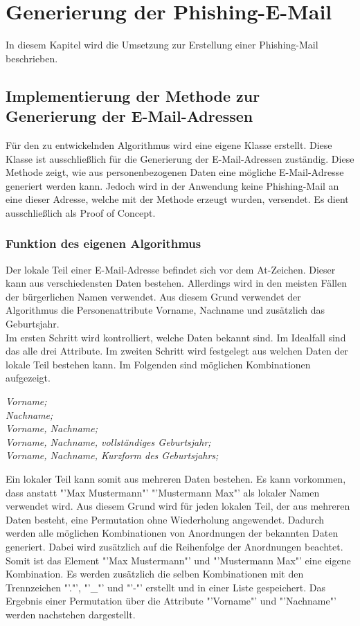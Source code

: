 
\chapter{Generierung der Phishing-E-Mail}  %
\label{cha:ErstellungeinerPhishing-Mail} %
In diesem Kapitel wird die Umsetzung zur Erstellung einer Phishing-Mail beschrieben.

\section{Implementierung der Methode zur Generierung der E-Mail-Adressen}	
Für den zu entwickelnden Algorithmus wird eine eigene Klasse erstellt. Diese Klasse ist ausschließlich für die Generierung der E-Mail-Adressen zuständig. Diese Methode zeigt, wie aus personenbezogenen Daten eine mögliche E-Mail-Adresse generiert werden kann. Jedoch wird in der Anwendung keine Phishing-Mail an eine dieser Adresse, welche mit der Methode erzeugt wurden, versendet. Es dient ausschließlich als Proof of Concept.

	\subsection{Funktion des eigenen Algorithmus}
	Der lokale Teil einer E-Mail-Adresse befindet sich vor dem At-Zeichen. Dieser kann aus verschiedensten Daten bestehen. Allerdings wird in den meisten Fällen der bürgerlichen Namen verwendet. \cite{NameAlsEMail} Aus diesem Grund verwendet der Algorithmus die Personenattribute Vorname, Nachname und zusätzlich das Geburtsjahr.\\
	Im ersten Schritt wird kontrolliert, welche Daten bekannt sind. Im Idealfall sind das alle drei Attribute. Im zweiten Schritt wird festgelegt aus welchen Daten der lokale Teil bestehen kann. Im Folgenden sind möglichen Kombinationen aufgezeigt.
	
	\textit{Vorname;}\\
	\textit{Nachname;}\\
	\textit{Vorname, Nachname;}\\
	\textit{Vorname, Nachname, vollständiges Geburtsjahr;}\\
	\textit{Vorname, Nachname, Kurzform des Geburtsjahrs;}
	
	Ein lokaler Teil kann somit aus mehreren Daten bestehen. Es kann vorkommen, dass anstatt "'Max Mustermann"' "'Mustermann Max"' als lokaler Namen verwendet wird. Aus diesem Grund wird für jeden lokalen Teil, der aus mehreren Daten besteht, eine Permutation ohne Wiederholung angewendet. Dadurch werden alle möglichen Kombinationen von Anordnungen der bekannten Daten generiert. Dabei wird zusätzlich auf die Reihenfolge der Anordnungen beachtet. Somit ist das Element "'Max Mustermann"' und "'Mustermann Max"' eine eigene Kombination. Es werden zusätzlich die selben Kombinationen mit den Trennzeichen "'."', "'\_"' und "'-"' erstellt und in einer Liste gespeichert. Das Ergebnis einer Permutation über die Attribute "'Vorname"' und "'Nachname"' werden nachstehen dargestellt.
	
